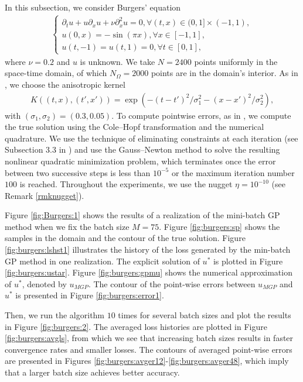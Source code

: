 \documentclass[10pt,reqno]{amsart}
\newcommand{\1}{{\chi}}
\numberwithin{equation}{section}
\theoremstyle{thmlemcorr}
\numberwithin{theorem}{section}
\theoremstyle{thmlemcorr*}
\theoremstyle{defi}
\theoremstyle{remexample}
\theoremstyle{ass}
\begin{document}
In this subsection, we consider Burgers' equation
\begin{align*}
	\begin{cases}
		\partial_t u + u \partial_x u + \nu \partial_x^2 u = 0, \forall (t, x)\in (0, 1]\times (-1, 1),\\
		u(0, x) = -\sin(\pi x), \forall x\in [-1, 1],\\
		u(t, -1) = u(t, 1)=0, \forall t\in [0, 1],
	\end{cases}
\end{align*}
where $\nu=0.2$ and  $u$ is unknown. 
We take $N=2400$ points uniformly in the space-time domain, of which $N_\Omega=2000$ points are in the domain's interior. As in \cite{chen2021solving}, we choose the anisotropic kernel
\begin{align}
	\label{anisotropickn}
	K((t, x), (t', x'))=\operatorname{exp}(-(t-t')^2/\sigma_1^2-(x-x')^2/{\sigma_2^2}),
\end{align}
with $(\sigma_1, \sigma_2)=(0.3, 0.05)$. To compute pointwise errors, as in \cite{chen2021solving}, we compute the true solution using the Cole--Hopf transformation and the numerical quadrature. We use the technique of eliminating constraints at each iteration (see Subsection 3.3 in \cite{chen2021solving}) and use the Gauss--Newton method to solve the resulting nonlinear quadratic minimization problem, which terminates once the error between two successive steps is less than $10^{-5}$ or the maximum iteration number $100$ is reached. Throughout the experiments, we use the nugget $\eta=10^{-10}$ (see Remark \ref{rmknugget}). 

Figure \ref{fig:Burgers:1} shows the results of a realization of the mini-batch GP method when we fix the batch size $M=75$. Figure \ref{fig:burgers:sp} shows the samples in the domain and the contour of the true solution. Figure \ref{fig:burgers:lshst1} illustrates the history of the loss generated by the min-batch GP method in one realization. The explicit solution of $u^*$ is plotted in Figure  \ref{fig:burgers:ustar}. Figure \ref{fig:burgers:gpmu} shows the numerical approximation of $u^*$, denoted by $u_{MGP}$. The contour of the point-wise errors between $u_{MGP}$ and $u^*$ is presented in Figure \ref{fig:burgers:error1}.

Then, we run the algorithm $10$ times for several batch sizes and plot the results in Figure \ref{fig:burgers:2}. The averaged loss histories are plotted in Figure \ref{fig:burgers:avgls}, from which we see that  increasing batch sizes results in faster convergence rates and smaller losses. The contours of averaged point-wise errors are presented in Figures \ref{fig:burgers:avger12}-\ref{fig:burgers:avger48}, which imply that a larger batch size achieves better accuracy. 
\end{document}
